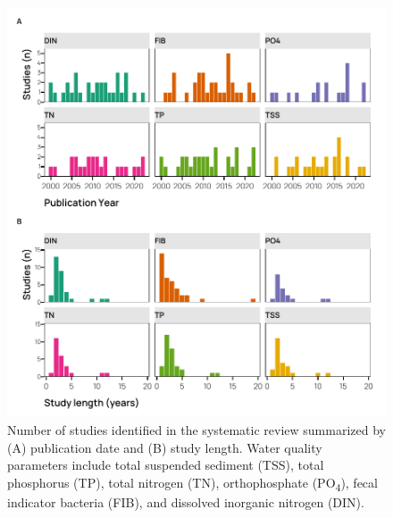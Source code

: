 \documentclass[utf8]{FrontiersinHarvard}
\begin{document}
\begin{figure}
\includegraphics[width=1\linewidth,]{frontiers_submission_revision_01_files/figure-latex/fig3} \caption{Number of studies identified in the systematic review summarized by (A) publication date and (B) study length. Water quality parameters include total suspended sediment (TSS), total phosphorus (TP), total nitrogen (TN), orthophosphate (PO\textsubscript{4}), fecal indicator bacteria (FIB), and dissolved inorganic nitrogen (DIN).}\label{fig:fig3}
\end{figure}
\end{document}
